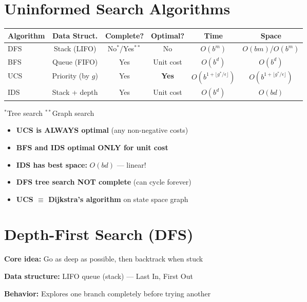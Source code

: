 \documentclass[11pt,a4paper]{article}
\begin{document}
\section{Uninformed Search Algorithms}

\begin{definitionbox}
\begin{center}
\begin{tabular}{@{}lccccc@{}}
\toprule
\textbf{Algorithm} & \textbf{Data Struct.} & \textbf{Complete?} & \textbf{Optimal?} & \textbf{Time} & \textbf{Space} \\
\midrule
DFS & Stack (LIFO) & No$^*$/Yes$^{**}$ & No & $O(b^m)$ & $O(bm)$/$O(b^m)$ \\
BFS & Queue (FIFO) & Yes & Unit cost & $O(b^d)$ & $O(b^d)$ \\
UCS & Priority (by $g$) & Yes & \textbf{Yes} & $O(b^{1+\lfloor g^*/\epsilon\rfloor})$ & $O(b^{1+\lfloor g^*/\epsilon\rfloor})$ \\
IDS & Stack + depth & Yes & Unit cost & $O(b^d)$ & $O(bd)$ \\
\bottomrule
\end{tabular}
\end{center}
$^*$Tree search \quad $^{**}$Graph search
\end{definitionbox}

\begin{warningbox}
\begin{itemize}[leftmargin=*,nosep]
\item \textbf{UCS is ALWAYS optimal} (any non-negative costs)
\item \textbf{BFS and IDS optimal ONLY for unit cost}
\item \textbf{IDS has best space:} $O(bd)$ --- linear!
\item \textbf{DFS tree search NOT complete} (can cycle forever)
\item \textbf{UCS $\equiv$ Dijkstra's algorithm} on state space graph
\end{itemize}
\end{warningbox}

\section{Depth-First Search (DFS)}

\begin{definitionbox}
\textbf{Core idea:} Go as deep as possible, then backtrack when stuck

\textbf{Data structure:} LIFO queue (stack) --- Last In, First Out

\textbf{Behavior:} Explores one branch completely before trying another
\end{definitionbox}
\end{document}

